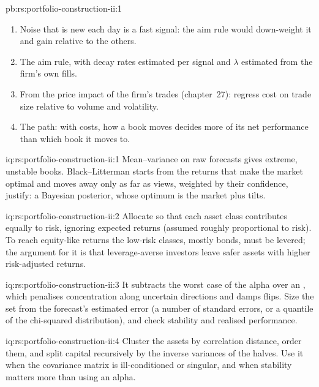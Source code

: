 \begin{solution}{pb:rs:portfolio-construction-ii:1}
\begin{enumerate}
\item Noise that is new each day is a fast signal: the aim rule would down-weight it and gain relative to the others.
\item The aim rule, with decay rates estimated per signal and $\lambda$ estimated from the firm's own fills.
\item From the price impact of the firm's trades (chapter~27): regress cost on trade size relative to volume and volatility.
\item The path: with costs, how a book moves decides more of its net performance than which book it moves to.
\end{enumerate}
\end{solution}

\begin{solution}{iq:rs:portfolio-construction-ii:1}
Mean--variance on raw forecasts gives extreme, unstable books. Black--Litterman starts from the returns that make the market optimal and moves away only as far as
views, weighted by their confidence, justify: a Bayesian posterior, whose optimum is the market plus tilts.
\end{solution}

\begin{solution}{iq:rs:portfolio-construction-ii:2}
Allocate so that each asset class contributes equally to risk, ignoring expected returns (assumed roughly proportional to risk). To reach equity-like returns the
low-risk classes, mostly bonds, must be levered; the argument for it is that leverage-averse investors leave safer assets with higher risk-adjusted returns.
\end{solution}

\begin{solution}{iq:rs:portfolio-construction-ii:3}
It subtracts the worst case of the alpha over an , which penalises concentration along uncertain directions and damps flips. Size the set from the
forecast's estimated error (a number of standard errors, or a quantile of the chi-squared distribution), and check stability and realised performance.
\end{solution}

\begin{solution}{iq:rs:portfolio-construction-ii:4}
Cluster the assets by correlation distance, order them, and split capital recursively by the inverse variances of the halves. Use it when the covariance matrix is
ill-conditioned or singular, and when stability matters more than using an alpha.
\end{solution}

